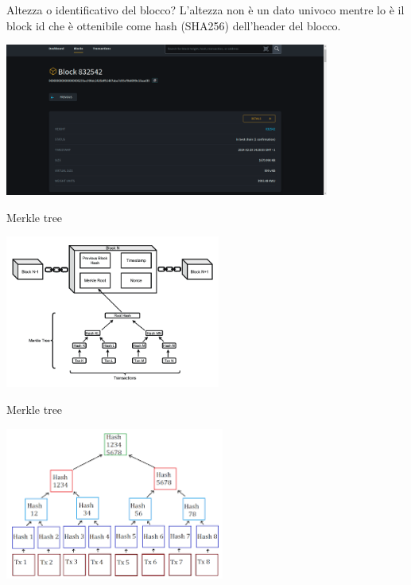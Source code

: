 \documentclass[aspectratio=169]{beamer}
\begin{document}
\begin{frame}{Altezza o identificativo del blocco?}
    L'altezza non è un dato univoco mentre lo è il block id che è ottenibile come hash (SHA256) dell'header del blocco.
    \begin{center}
        \includegraphics[height=5cm]{blockid.png}
    \end{center}
\end{frame}

\begin{frame}{Merkle tree}
    \begin{center}
        \includegraphics[height=5cm]{merkle.png}
    \end{center}
\end{frame}

\begin{frame}{Merkle tree}
   \begin{center}
        \includegraphics[height=5cm]{merkle_2.png}
    \end{center}
\end{frame}
\end{document}
